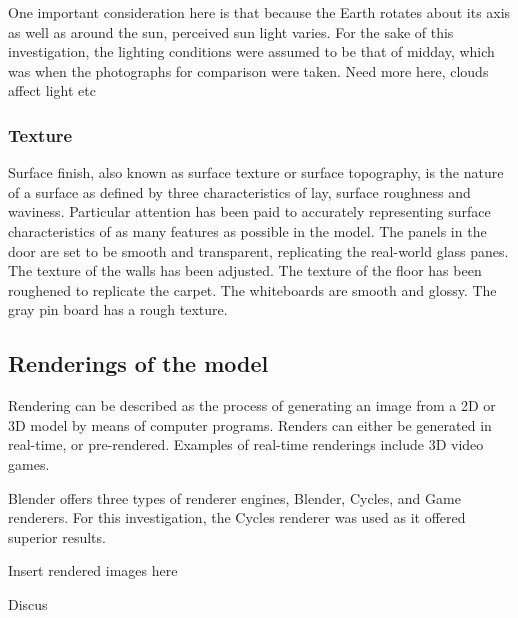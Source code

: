 \documentclass[11pt,a4paper]{report}
\begin{document}
						One important consideration here is that because the Earth rotates about its axis as well as around the sun, perceived sun light varies. For the sake of this investigation, the lighting conditions were assumed to be that of midday, which was when the photographs for comparison were taken. {{Need more here, clouds affect light etc}}
						
				\subsubsection{Texture}
					Surface finish, also known as surface texture or surface topography, is the nature of a surface as defined by three characteristics of lay, surface roughness and waviness.
					\cite{e._paul_degarmo_materials_2003}
					Particular attention has been paid to accurately representing surface characteristics of as many features as possible in the model.
					The panels in the door are set to be smooth and transparent, replicating the real-world glass panes. 
					The texture of the walls has been adjusted.
					The texture of the floor has been roughened to replicate the carpet.
					The whiteboards are smooth and glossy.
					The gray pin board has a rough texture.
			
			\subsection{Renderings of the model}
				Rendering can be described as the process of generating an image from a 2D or 3D model by means of computer programs. Renders can either be generated in real-time, or pre-rendered. Examples of real-time renderings include 3D video games.
				
				Blender offers three types of renderer engines, Blender, Cycles, and Game renderers. For this investigation, the Cycles renderer was used as it offered superior results.
				
				{{Insert rendered images here}} 
				
				Discus 
			

			
\end{document}
